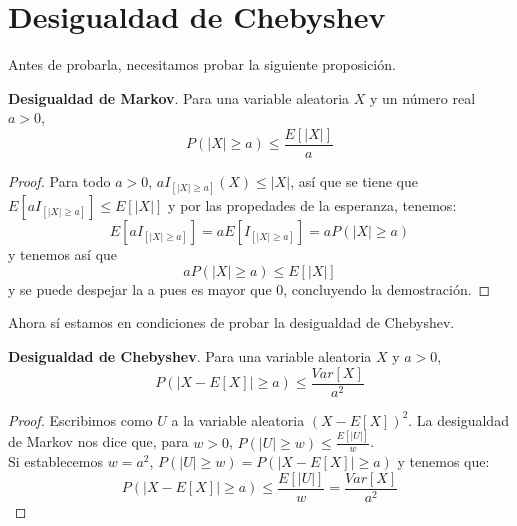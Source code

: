 \section{Desigualdad de Chebyshev}\label{st:Cheby}
Antes de probarla, necesitamos probar la siguiente proposición.
\begin{proposicion}
\textbf{Desigualdad de Markov}. Para una variable aleatoria $X$ y un número real $a>0$,
\[ P(\vert X \vert \geq a) \leq \frac{E \left[ \vert X \vert \right]}{a} \]
\end{proposicion}
\begin{proof}
Para todo $a>0$, $aI_{[ \vert X \vert  \geq a]}(X) \leq \vert X \vert$, así que se tiene que $E[aI_{[ \vert X \vert  \geq a]}] \leq E[\vert X \vert]$ y por las propedades de la esperanza, tenemos:
\[ E[aI_{[ \vert X \vert  \geq a]}] = aE[I_{[ \vert X \vert  \geq a]}] = aP(\vert X \vert \geq a) \] y tenemos así que
\[ aP(\vert X \vert \geq a) \leq E \left[ \vert X \vert \right] \]
y se puede despejar la a pues es mayor que 0, concluyendo la demostración.
\end{proof}
Ahora sí estamos en condiciones de probar la desigualdad de Chebyshev.
\begin{proposicion}
\textbf{Desigualdad de Chebyshev}. Para una variable aleatoria $X$ y $a>0$,
\[ P(\vert X - E[X] \vert \geq a) \leq \frac{Var[X]}{a^{2}} \]
\end{proposicion}
\begin{proof}
Escribimos como $U$ a la variable aleatoria $(X - E[X])^{2}$. La desigualdad de Markov nos dice que, para $w>0$, $P(\vert U \vert \geq w) \leq \frac{E[\vert U \vert]}{w}$.\\
Si establecemos $w=a^{2}$, $P(\vert U \vert \geq w) = P(\vert X-E[X] \vert \geq a)$ y tenemos que:
\[ P(\vert X-E[X] \vert \geq a) \leq \frac{E[\vert U \vert]}{w}= \frac{Var[X]}{a^{2}} \]
\end{proof}

\cite{forsyth2018probability}
\endinput




















